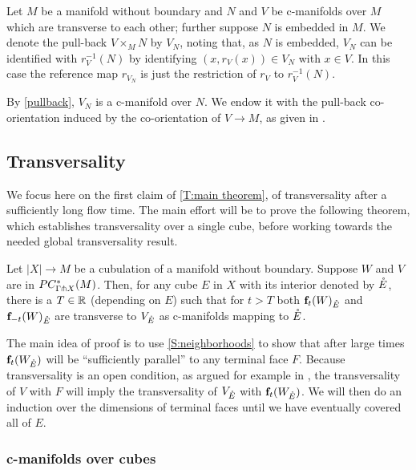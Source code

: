 \begin{definition}
	Let $M$ be a manifold without boundary and $N$ and $V$ be c-manifolds over $M$ which are transverse to each other; further suppose $N$ is embedded in $M$.
	We denote the pull-back $V \times_M N$ by $V_N$, noting that, as $N$ is embedded, $V_N$ can be identified with $r_V^{-1}(N)$ by identifying $(x, r_V(x)) \in V_N$ with $x \in V$.
	In this case the reference map $r_{V_N}$ is just the restriction of $r_V$ to $r_V^{-1}(N)$.

	By \cref{pullback}, $V_N$ is a c-manifold over $N$.
	We endow it with the pull-back co-orientation induced by the co-orientation of $V\to M$, as given in \cite[Sections 3.5.1 and 3.5.2]{medina2022foundations}.
\end{definition}

\subsection{Transversality}

We focus here on the first claim of \cref{T:main theorem}, of transversality after a sufficiently long flow time.
The main effort will be to prove the following theorem, which establishes transversality over a single cube, before working towards the needed global transversality result.

\begin{theorem}\label{T:transversality}
	Let $|X| \to M$ be a cubulation of a manifold without boundary.
	Suppose $W$ and $V$ are in $PC_{\Gamma \pitchfork X}^*(M)$.
	Then, for any cube $E$ in $X$ with its interior denoted by $\mathring{E}$, there is a $T \in \mathbb{R}$ (depending on $E$) such that for $t > T$ both $\mathbf{f}_t(W)_{\mathring{E}}$ and $\mathbf{f}_{-t}(W)_{\mathring{E}}$ are transverse to $V_{\mathring{E}}$ as c-manifolds mapping to $\mathring{E}$.
\end{theorem}


The main idea of proof is to use \cref{S:neighborhoods} to show that after large times $\mathbf{f}_t(W_{\mathring{E}})$ will be
``sufficiently parallel'' to any terminal face $F$.
Because transversality is an open condition, as argued for example in \cite[Section 1.6]{GuPo74}, the transversality of $V$ with $F$ will imply the transversality of $V_{\mathring{E}}$ with $\mathbf{f}_t(W_{\mathring{E}})$.
We will then do an induction over the dimensions of terminal faces until we have eventually covered all of $E$.

\medskip

\subsubsection{c-manifolds over cubes}\label{reductiontocubes}

